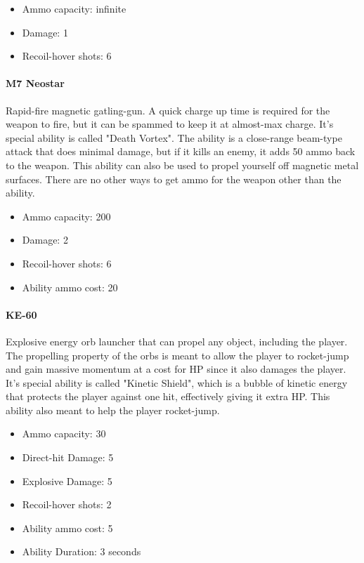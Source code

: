 \documentclass[../Main.tex]{subfiles}
\begin{document}
\begin{itemize}
	\item Ammo capacity: infinite
	\item Damage: 1
	\item Recoil-hover shots: 6
\end{itemize}

\paragraph{M7 Neostar}

Rapid-fire magnetic gatling-gun. A quick charge up time is required for the weapon to fire, but it can be spammed to keep it at almost-max charge. It's special ability is called "Death Vortex". The ability is a close-range beam-type attack that does minimal damage, but if it kills an enemy, it adds 50 ammo back to the weapon. This ability can also be used to propel yourself off magnetic metal surfaces. There are no other ways to get ammo for the weapon other than the ability.

\begin{itemize}
	\item Ammo capacity: 200
	\item Damage: 2
	\item Recoil-hover shots: 6
	\item Ability ammo cost: 20
\end{itemize}


\paragraph{KE-60}

Explosive energy orb launcher that can propel any object, including the player. The propelling property of the orbs is meant to allow the player to rocket-jump and gain massive momentum at a cost for HP since it also damages the player. It's special ability is called "Kinetic Shield", which is a bubble of kinetic energy that protects the player against one hit, effectively giving it extra HP. This ability also meant to help the player rocket-jump. 

\begin{itemize}
	\item Ammo capacity: 30
	\item Direct-hit Damage: 5
	\item Explosive Damage: 5
	\item Recoil-hover shots: 2
	\item Ability ammo cost: 5
	\item Ability Duration: 3 seconds
\end{itemize} 
\end{document}
